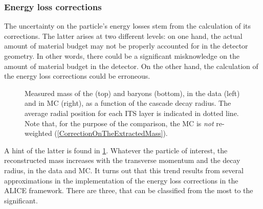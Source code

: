 \subsubsection{Energy loss corrections}
\label{subsubsec:ImperfectEnergyLossCorrections}

The uncertainty on the particle's energy losses stem from the calculation of its corrections. The latter arises at two different levels: on one hand, the actual amount of material budget may not be properly accounted for in the detector geometry. In other words, there could be a significant misknowledge on the amount of material budget in the detector. On the other hand, the calculation of the energy loss corrections could be erroneous.

\begin{figure}[t]
\hspace*{-1.5cm}
\hspace*{-1.5cm}
\caption{Measured mass of the \rmXi (top) and \rmOmega baryons (bottom), in the data (left) and in MC (right), as a function of the cascade decay radius. The average radial position for each ITS layer is indicated in dotted line. Note that, for the purpose of the comparison, the MC is \textit{not} re-weighted (\Sec\ref{CorrectionOnTheExtractedMass}).}
	\label{fig:MassVsRadius}
\end{figure}

A hint of the latter is found in \fig\ref{fig:MassVsRadius}. Whatever the particle of interest, the reconstructed mass increases with the transverse momentum and the decay radius, in the data and MC. It turns out that this trend results from several approximations in the implementation of the energy loss corrections in the ALICE framework. There are three, that can be classified from the most to the  significant.

